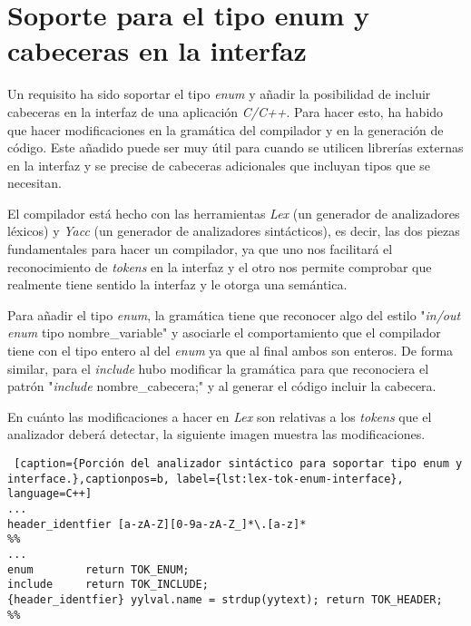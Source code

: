 \section{Soporte para el tipo enum y cabeceras en la interfaz}

Un requisito ha sido soportar el tipo \textit{enum} y añadir la posibilidad de incluir cabeceras en la interfaz de una aplicación \textit{C/C++}. Para hacer esto, ha habido que hacer modificaciones en la gramática del compilador y en la generación de código. Este añadido puede ser muy útil para cuando se utilicen librerías externas en la interfaz y se precise de cabeceras adicionales que incluyan tipos que se necesitan.

\par\bigskip

El compilador está hecho con las herramientas \textit{Lex} (un generador de analizadores léxicos) y \textit{Yacc} (un generador de analizadores sintácticos), es decir, las dos piezas fundamentales para hacer un compilador, ya que uno nos facilitará el reconocimiento de \textit{tokens} en la interfaz y el otro nos permite comprobar que realmente tiene sentido la interfaz y le otorga una semántica.

\par\bigskip

Para añadir el tipo \textit{enum}, la gramática tiene que reconocer algo del estilo "\textit{in/out enum} tipo nombre\_variable" y asociarle el comportamiento que el compilador tiene con el tipo entero al del \textit{enum} ya que al final ambos son enteros. De forma similar, para el \textit{include} hubo modificar la gramática para que reconociera el patrón "\textit{include} nombre\_cabecera;" y al generar el código incluir la cabecera.

\par\bigskip

En cuánto las modificaciones a hacer en \textit{Lex} son relativas a los \textit{tokens} que el analizador deberá detectar, la siguiente imagen muestra las modificaciones.

\bigskip

\begin{minipage}{\linewidth}
\begin{lstlisting} [caption={Porción del analizador sintáctico para soportar tipo enum y interface.},captionpos=b, label={lst:lex-tok-enum-interface}, language=C++]
...
header_identfier [a-zA-Z][0-9a-zA-Z_]*\.[a-z]*
%%
...
enum        return TOK_ENUM;
include     return TOK_INCLUDE;
{header_identfier} yylval.name = strdup(yytext); return TOK_HEADER;
%%
\end{lstlisting}
\end{minipage}

